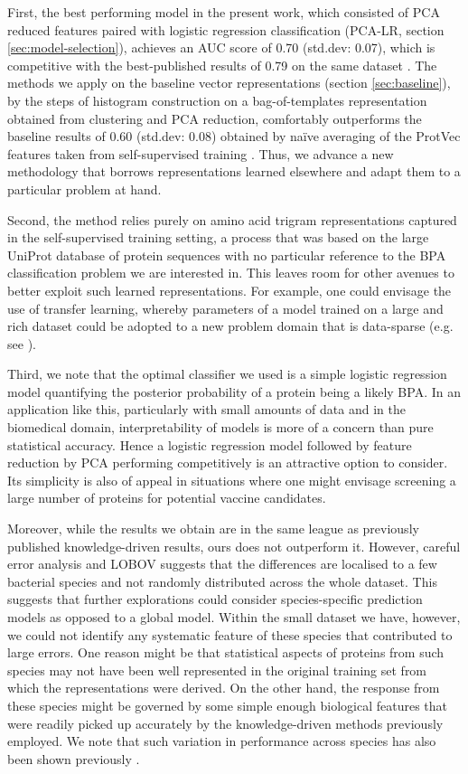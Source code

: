 \documentclass[10pt,journal,compsoc,twoside]{IEEEtran}
\begin{document}
First, the best performing model in the present work, which consisted of PCA reduced features paired with logistic regression classification (PCA-LR, section \ref{sec:model-selection}), achieves an AUC score of 0.70 (std.dev: 0.07), which is competitive with the best-published results of 0.79 on the same dataset \cite{heinson_2017}. The methods we apply on the baseline vector representations (section \ref{sec:baseline}), by the steps of histogram construction on a bag-of-templates representation obtained from clustering and PCA reduction, comfortably outperforms the baseline results of 0.60 (std.dev: 0.08) obtained by naïve averaging of the ProtVec features taken from self-supervised training \cite{protvec}. Thus, we advance a new methodology that borrows representations learned elsewhere and adapt them to a particular problem at hand.

Second, the method relies purely on amino acid trigram representations captured in the self-supervised training setting, a process that was based on the large UniProt database of protein sequences \cite{uniprot_2018} with no particular reference to the BPA classification problem we are interested in. This leaves room for other avenues to better exploit such learned representations. For example, one could envisage the use of transfer learning, whereby parameters of a model trained on a large and rich dataset could be adopted to a new problem domain that is data-sparse (e.g. see  \cite{du_transfer-learning}). 

Third, we note that the optimal classifier we used is a simple logistic regression model quantifying the posterior probability of a protein being a likely BPA. In an application like this, particularly with small amounts of data and in the biomedical domain, interpretability of models is more of a concern than pure statistical accuracy. Hence a logistic regression model followed by feature reduction by PCA performing competitively is an attractive option to consider. Its simplicity is also of appeal in situations where one might envisage screening a large number of proteins for potential vaccine candidates.

Moreover, while the results we obtain are in the same league as previously published knowledge-driven results, ours does not outperform it. However, careful error analysis and LOBOV suggests that the differences are localised to a few bacterial species and not randomly distributed across the whole dataset. This suggests that further explorations could consider species-specific prediction models as opposed to a global model. Within the small dataset we have, however, we could not identify any systematic feature of these species that contributed to large errors. One reason might be that statistical aspects of proteins from such species may not have been well represented in the original training set from which the representations were derived. On the other hand, the response from these species might be governed by some simple enough biological features that were readily picked up accurately by the knowledge-driven methods previously employed. We note that such variation in performance across species has also been shown previously \cite{heinson_2019}.
\end{document}
